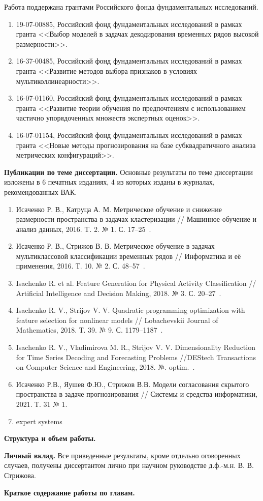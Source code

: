 Работа поддержана грантами Российского фонда фундаментальных исследований.
\begin{enumerate}
	\item 19-07-00885, Российский фонд фундаментальных исследований в рамках гранта <<Выбор моделей в задачах декодирования временных рядов высокой размерности>>.
	\item 16-37-00485, Российский фонд фундаментальных исследований в рамках гранта <<Развитие методов выбора признаков в условиях мультиколлинеарности>>.
	\item 16-07-01160, Российский фонд фундаментальных исследований в рамках гранта <<Развитие теории обучения по предпочтениям с использованием частично упорядоченных множеств экспертных оценок>>.
	\item 16-07-01154, Российский фонд фундаментальных исследований в рамках гранта <<Новые методы прогнозирования на базе субквадратичного анализа метрических конфигураций>>.
\end{enumerate}

\vspace{0.5cm}
\textbf{Публикации по теме диссертации.}
Основные результаты по теме диссертации изложены в 6 печатных изданиях, 4 из которых изданы в журналах, рекомендованных ВАК.

\begin{enumerate}
	\item Исаченко Р. В., Катруца А. М. Метрическое обучение и снижение размерности пространства в задачах кластеризации // Машинное обучение и анализ данных, 2016. T. 2. № 1. С. 17--25~\cite{isachenko2016metricjmlda}.
	\item Исаченко Р. В., Стрижов В. В. Метрическое обучение в задачах мультиклассовой классификации временных рядов // Информатика и её применения, 2016. Т. 10. № 2. С. 48--57~\cite{isachenko2016metricia}.
	\item Isachenko R. et al. Feature Generation for Physical Activity Classification // Artificial Intelligence and Decision Making, 2018. № 3. С. 20--27~\cite{isachenko2018feature}.
	\item Isachenko R. V., Strijov V. V. Quadratic programming optimization with feature selection for nonlinear models // Lobachevskii Journal of Mathematics, 2018. Т. 39. № 9. С. 1179--1187~\cite{isachenko2018quadratic}.
	\item Isachenko R. V., Vladimirova M. R., Strijov V. V. Dimensionality Reduction for Time Series Decoding and Forecasting Problems //DEStech Transactions on Computer Science and Engineering, 2018. №. optim.~\cite{isachenko2018plsdestech}.
	\item Исаченко Р.В., Яушев Ф.Ю., Стрижов В.В. Модели согласования скрытого пространства в задаче прогнозирования // Системы и средства информатики, 2021. Т. 31 № 1.~\cite{isachenko2021concordance}
	\item {\color{red} expert systems}
\end{enumerate}

\vspace{0.5cm}
\textbf{Структура и объем работы.}

\vspace{0.5cm}
\textbf{Личный вклад.}
Все приведенные результаты, кроме отдельно оговоренных случаев, получены диссертантом лично при научном руководстве д.ф.-м.н. В. В. Стрижова.

\vspace{0.5cm}
\textbf{Краткое содержание работы по главам.}